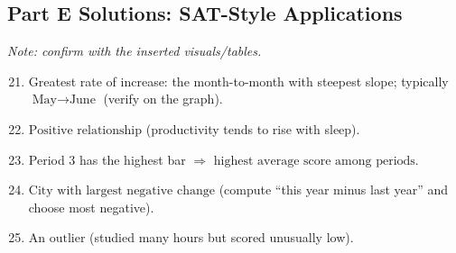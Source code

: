 \documentclass[12pt]{article}
\begin{document}
\subsection*{Part E Solutions: SAT-Style Applications}
\textit{Note: confirm with the inserted visuals/tables.}
\begin{enumerate}
  \setcounter{enumi}{20}
  \item Greatest rate of increase: the month-to-month with steepest slope; typically \(\boxed{\text{May}\to\text{June}}\) (verify on the graph).
  \item \(\boxed{\text{Positive relationship}}\) (productivity tends to rise with sleep).
  \item Period 3 has the highest bar \(\Rightarrow\) \(\boxed{\text{highest average score among periods}}\).
  \item \(\boxed{\text{City with largest negative change}}\) (compute “this year minus last year” and choose most negative).
  \item \(\boxed{\text{An outlier}}\) (studied many hours but scored unusually low).
\end{enumerate}
\end{document}
